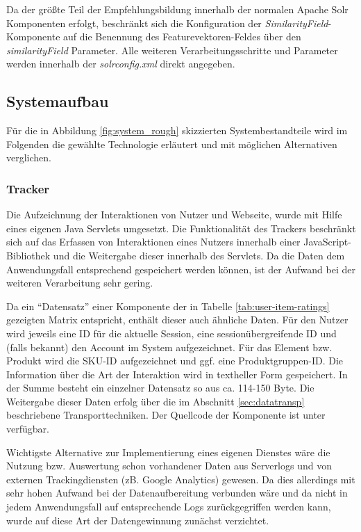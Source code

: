 Da der größte Teil der Empfehlungsbildung innerhalb der normalen Apache Solr Komponenten erfolgt, beschränkt sich die Konfiguration der \textit{SimilarityField}-Komponente auf die Benennung des Featurevektoren-Feldes über den \textit{similarityField} Parameter. Alle weiteren Verarbeitungsschritte und Parameter werden innerhalb der \textit{solrconfig.xml} direkt angegeben.

\subsection{Systemaufbau}

Für die in Abbildung \ref{fig:system_rough} skizzierten Systembestandteile wird im Folgenden die gewählte Technologie erläutert und mit möglichen Alternativen verglichen. 

\subsubsection{Tracker} \label{sec:tracker-impl} Die Aufzeichnung der Interaktionen von Nutzer und Webseite, wurde mit Hilfe eines eigenen Java Servlets umgesetzt. Die Funktionalität des Trackers beschränkt sich auf das Erfassen von Interaktionen eines Nutzers innerhalb einer JavaScript-Bibliothek und die Weitergabe dieser innerhalb des Servlets. Da die Daten dem Anwendungsfall entsprechend gespeichert werden können, ist der Aufwand bei der weiteren Verarbeitung sehr gering. 

Da ein ``Datensatz'' einer Komponente der in Tabelle \ref{tab:user-item-ratings} gezeigten Matrix entspricht, enthält dieser auch ähnliche Daten. Für den Nutzer wird jeweils eine ID für die aktuelle Session, eine sessionübergreifende ID und (falls bekannt) den Account im System aufgezeichnet. Für das Element bzw. Produkt wird die SKU-ID aufgezeichnet und ggf. eine Produktgruppen-ID. Die Information über die Art der Interaktion wird in textheller Form gespeichert. In der Summe besteht ein einzelner Datensatz so aus ca. 114-150 Byte. Die Weitergabe dieser Daten erfolg über die im Abschnitt \ref{sec:datatransp} beschriebene Transporttechniken. Der Quellcode der Komponente ist unter  verfügbar. 

Wichtigste Alternative zur Implementierung eines eigenen Dienstes wäre die Nutzung bzw. Auswertung schon vorhandener Daten aus Serverlogs und von externen Trackingdiensten (zB. Google Analytics) gewesen. Da dies allerdings mit sehr hohen Aufwand bei der Datenaufbereitung verbunden wäre und da nicht in jedem Anwendungsfall auf entsprechende Logs zurückgegriffen werden kann, wurde auf diese Art der Datengewinnung zunächst verzichtet.

